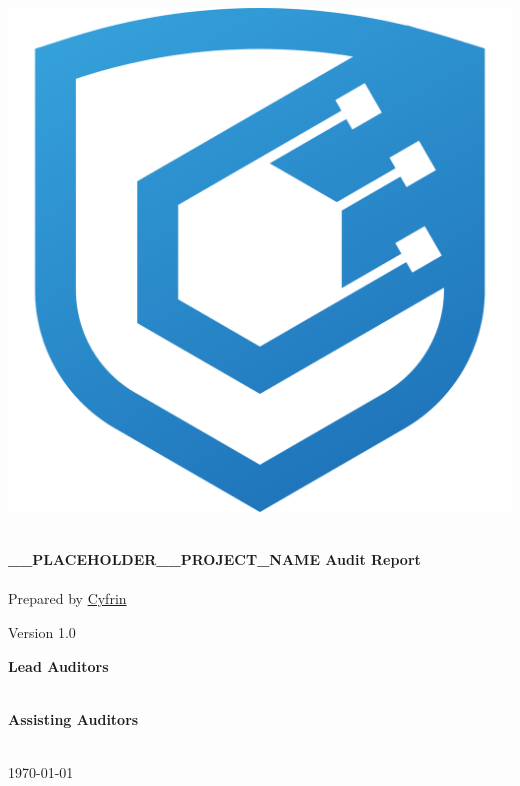 \begin{titlepage}
\begin{center}
      \includegraphics[scale=0.25]{img/cyfrin-logo.png} %
      
      \vfill
    \fi

    \noindent\makebox[\linewidth]{\rule{.7\paperwidth}{.6pt}}\\[0.7cm]

    {\huge \bfseries
      __PLACEHOLDER__PROJECT_NAME Audit Report
    }\\[0.25cm]
    
    \noindent\makebox[\linewidth]{\rule{.7\paperwidth}{.6pt}}\\[0.7cm]

    \large
    Prepared by \href{https://cyfrin.io}{Cyfrin}

    \large{
      Version 1.0
    }\\[1.2cm]
    
    \vfill

    \large
    {\bfseries Lead Auditors}\\

    \vspace{0.2cm}
    \\
    \vspace{1cm}


    \large
    {\bfseries Assisting Auditors}\\

    \vspace{0.2cm}
    \\
    \vspace{1cm}

    \bigbreak
    \vfill
    
    {\normalsize \today}

  \end{center}

\end{titlepage}
